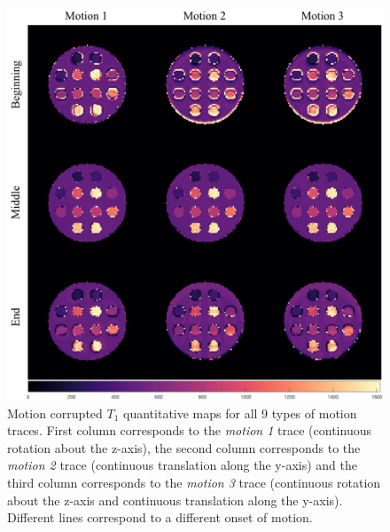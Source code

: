 \begin{figure}[ht]
    \centering
    \includegraphics[width=1\textwidth]{images/mrf/T1mapsmotion}
    \caption{Motion corrupted $T_1$ quantitative maps for all 9 types of motion traces. First column corresponds to the \textit{motion 1} trace (continuous rotation about the z-axis), the second column corresponds to the \textit{motion 2} trace (continuous translation along the y-axis) and the third column corresponds to the \textit{motion 3} trace (continuous rotation about the z-axis and continuous translation along the y-axis). Different lines correspond to a different onset of motion.}
    \label{fig:appendixT1mapsmotion}
\end{figure}

